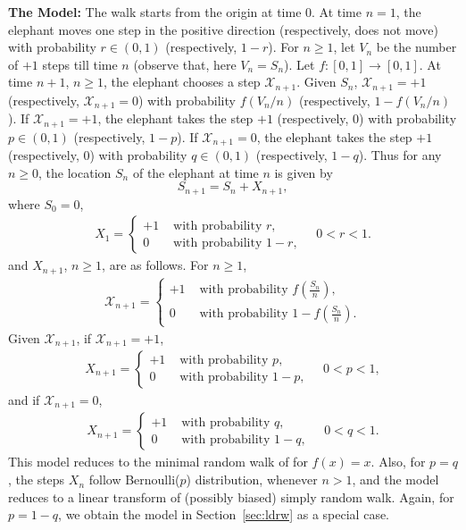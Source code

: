 \documentclass[12pt]{amsart}
\theoremstyle{plain}
\theoremstyle{remark}
\numberwithin{equation}{section}
\begin{document}
\noindent\textbf{The Model:} The walk starts from the origin at time $0$. At time $n = 1$, the elephant moves one step in the positive direction (respectively, does not move) with probability $r \in (0,1)$ (respectively, $1 - r$). For $n \geq 1$, let $V_n$ be the number of $+1$ steps till time $n$ (observe that, here $V_n = S_n$). Let $f : [0,1] \to [0,1]$. At time $n + 1$, $n \geq 1$, the elephant chooses a step $\mathcal{X}_{n+1}$. 
Given $S_n$,  $\mathcal{X}_{n+1} = +1$ (respectively, $\mathcal{X}_{n+1} = 0$) with probability $f(V_n/n)$ (respectively, $1-f(V_n/n)$). If $\mathcal{X}_{n+1} = +1$, the elephant takes the step $+1$ (respectively, $0$) with probability $p \in (0,1)$ (respectively, $1-p$). If $\mathcal{X}_{n+1} = 0$, the elephant takes the step $+1$ (respectively, $0$) with probability $q \in (0,1)$ (respectively, $1-q$). Thus for any $n\geq 0$, the location $S_n$ of the elephant at time $n$  is given by 
\[
    S_{n+1} = S_{n} + X_{n+1},
\]
where $S_0 = 0$, 
\begin{align*}
   X_{1} = \begin{cases} +1 &\text{ with probability } r, \\ 0
   &\text{ with probability } 1-r, \end{cases} \quad 0 < r < 1.
\end{align*}
and $X_{n+1}$, $n \geq 1$, are as follows. For $n \geq 1$, 
\begin{align*}
    \mathcal{X}_{n+1} = \begin{cases} +1 &\text{ with probability } f\left(\frac{S_n}{n}\right), \\ 0
   &\text{ with probability } 1-f\left(\frac{S_n}{n}\right).\end{cases}
\end{align*}
Given $\mathcal{X}_{n+1}$, if $\mathcal{X}_{n+1} = +1$,
\begin{align*}
   X_{n+1} = \begin{cases} +1 &\text{ with probability } p, \\ 0
   &\text{ with probability } 1-p, \end{cases} \quad 0 < p < 1,
\end{align*}
and if $\mathcal{X}_{n+1} = 0$,
\begin{align*}
   X_{n+1} = \begin{cases} +1 &\text{ with probability } q, \\ 0
   &\text{ with probability } 1-q, \end{cases} \quad 0 < q < 1.
\end{align*}
This model reduces to the minimal random walk of \cite{harbola2014memory} for $f(x) = x$. Also, for $p=q$, the steps $X_n$ follow Bernoulli($p$) distribution, whenever $n>1$, and the model reduces to a linear transform of (possibly biased) simply random walk. Again, for $p=1-q$, we obtain the model in Section~\ref{sec:ldrw} as a special case.
\end{document}
